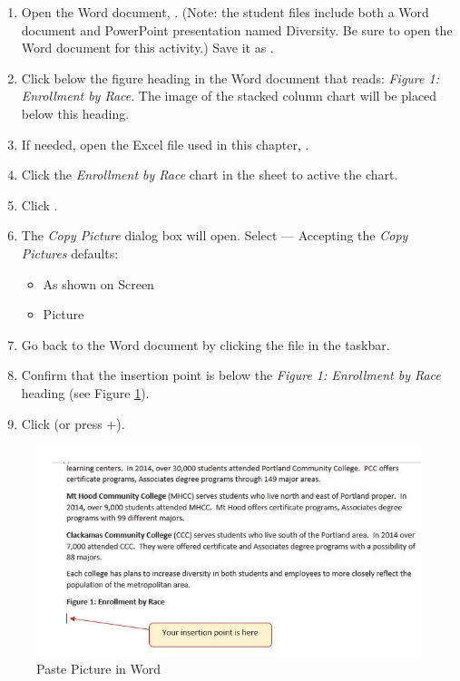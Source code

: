\begin{enumbox}
	\begin{enumerate}
		\item Open the Word document, . (Note: the student files include both a Word document and PowerPoint presentation named Diversity. Be sure to open the Word document for this activity.) Save it as .
		\item Click below the figure heading in the Word document that reads: \textit{Figure 1: Enrollment by Race}. The image of the stacked column chart will be placed below this heading.
		\item If needed, open the Excel file used in this chapter,  . 
		\item Click the \textit{Enrollment by Race} chart in the  sheet to active the chart.
		\item Click .
		\item The \textit{Copy Picture} dialog box will open. Select  --- Accepting the \textit{Copy Pictures} defaults:
		
		\begin{itemize}
			\item As shown on Screen
			\item Picture
		\end{itemize}	
	
		\item Go back to the  Word document by clicking the file in the taskbar.
		\item Confirm that the insertion point is below the \textit{Figure 1: Enrollment by Race} heading (see Figure \ref{04:fig46}).
		\item Click  (or press +).
	\end{enumerate}
\end{enumbox}
	
\begin{figure}[H]
	\centering
	\includegraphics[width=\maxwidth{.95\linewidth}]{gfx/ch04_fig46}
	\caption{Paste Picture in Word}
	\label{04:fig46}
\end{figure}

